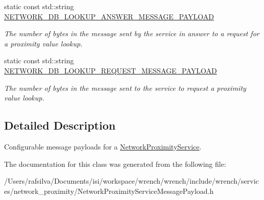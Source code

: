 \begin{DoxyCompactItemize}
\mbox{\label{classwrench_1_1_network_proximity_service_message_payload_ae8db9b59fd8a8ba3b3acb54c4b59f31a}} 
static const std\+::string \hyperlink{classwrench_1_1_network_proximity_service_message_payload_ae8db9b59fd8a8ba3b3acb54c4b59f31a}{N\+E\+T\+W\+O\+R\+K\+\_\+\+D\+B\+\_\+\+L\+O\+O\+K\+U\+P\+\_\+\+A\+N\+S\+W\+E\+R\+\_\+\+M\+E\+S\+S\+A\+G\+E\+\_\+\+P\+A\+Y\+L\+O\+AD}
\begin{DoxyCompactList}\small\item\em The number of bytes in the message sent by the service in answer to a request for a proximity value lookup. \end{DoxyCompactList}\item 
\mbox{\label{classwrench_1_1_network_proximity_service_message_payload_a495eafbd2b9f58a992d20ed10bc714d4}} 
static const std\+::string \hyperlink{classwrench_1_1_network_proximity_service_message_payload_a495eafbd2b9f58a992d20ed10bc714d4}{N\+E\+T\+W\+O\+R\+K\+\_\+\+D\+B\+\_\+\+L\+O\+O\+K\+U\+P\+\_\+\+R\+E\+Q\+U\+E\+S\+T\+\_\+\+M\+E\+S\+S\+A\+G\+E\+\_\+\+P\+A\+Y\+L\+O\+AD}
\begin{DoxyCompactList}\small\item\em The number of bytes in the message sent to the service to request a proximity value lookup. \end{DoxyCompactList}\end{DoxyCompactItemize}


\subsection{Detailed Description}
Configurable message payloads for a \hyperlink{classwrench_1_1_network_proximity_service}{Network\+Proximity\+Service}. 

The documentation for this class was generated from the following file\+:\begin{DoxyCompactItemize}
\item 
/\+Users/rafsilva/\+Documents/isi/workspace/wrench/wrench/include/wrench/services/network\+\_\+proximity/Network\+Proximity\+Service\+Message\+Payload.\+h\end{DoxyCompactItemize}
